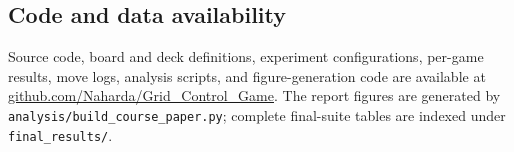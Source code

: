\documentclass[letterpaper]{article} %
\begin{document}
\subsection{Code and data availability}

Source code, board and deck definitions, experiment configurations, per-game results, move logs, analysis scripts, and figure-generation code are available at \url{github.com/Naharda/Grid_Control_Game}. The report figures are generated by \texttt{analysis/build\_course\_paper.py}; complete final-suite tables are indexed under \texttt{final\_results/}.


\end{document}
